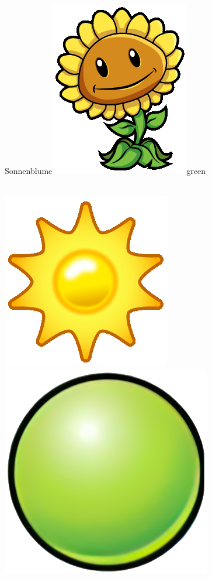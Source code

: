 \documentclass[11pt, a5paper]{article}
\def\now{\hspace{0.2cm}}
\begin{document}
	\begin{mybox}{Sonnenblume}{\includegraphics[scale=0.1]{sunflower}}{green}
		\phantom{My}\\ \\
		\tcblower
		\begin{minipage}[t]{\textwidth}
			\vspace*{-1.2cm}
			\now\includegraphics[scale=0.1]{sun} 
			\now\includegraphics[scale=0.075]{peap} 

\end{minipage}
\end{mybox}
\end{document}
